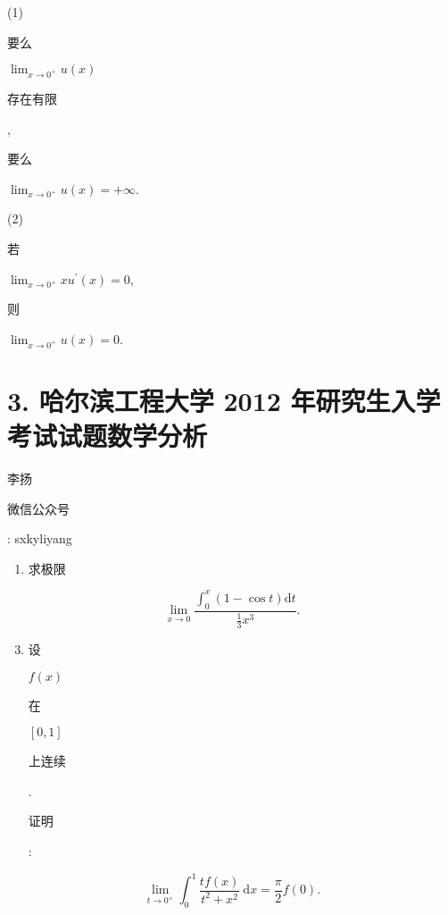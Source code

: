 \documentclass[10pt]{article}
\begin{document}
(1) \begin{CJK}{UTF8}{mj}要么\end{CJK} $\lim _{x \rightarrow 0^{+}} u(x)$ \begin{CJK}{UTF8}{mj}存在有限\end{CJK}, \begin{CJK}{UTF8}{mj}要么\end{CJK} $\lim _{x \rightarrow 0^{+}} u(x)=+\infty$.

(2) \begin{CJK}{UTF8}{mj}若\end{CJK} $\lim _{x \rightarrow 0^{+}} x u^{\prime}(x)=0$, \begin{CJK}{UTF8}{mj}则\end{CJK} $\lim _{x \rightarrow 0^{+}} u(x)=0$.

\section{3. 哈尔滨工程大学 2012 年研究生入学考试试题数学分析}
\begin{CJK}{UTF8}{mj}李扬\end{CJK}

\begin{CJK}{UTF8}{mj}微信公众号\end{CJK}: sxkyliyang

\begin{enumerate}
  \item \begin{CJK}{UTF8}{mj}求极限\end{CJK}
\end{enumerate}
$$
\lim _{x \rightarrow 0} \frac{\int_{0}^{x}(1-\cos t) \mathrm{d} t}{\frac{1}{3} x^{3}} .
$$

\begin{enumerate}
  \setcounter{enumi}{2}
  \item \begin{CJK}{UTF8}{mj}设\end{CJK} $f(x)$ \begin{CJK}{UTF8}{mj}在\end{CJK} $[0,1]$ \begin{CJK}{UTF8}{mj}上连续\end{CJK}. \begin{CJK}{UTF8}{mj}证明\end{CJK}:
\end{enumerate}
$$
\lim _{t \rightarrow 0^{+}} \int_{0}^{1} \frac{t f(x)}{t^{2}+x^{2}} \mathrm{~d} x=\frac{\pi}{2} f(0) .
$$
\end{document}
